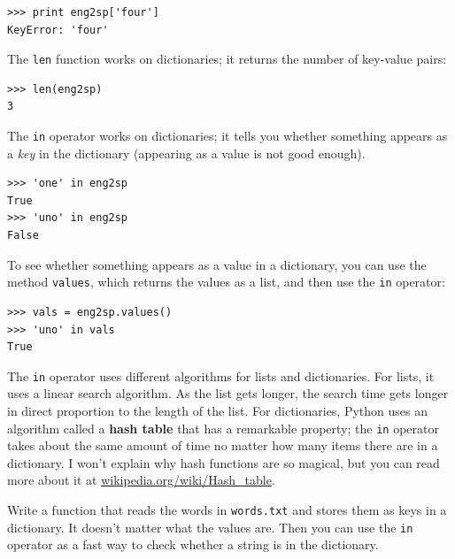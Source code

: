 \documentclass[10pt]{book}
\begin{document}

\beforeverb
\begin{verbatim}
>>> print eng2sp['four']
KeyError: 'four'
\end{verbatim}
\afterverb
%
The {\tt len} function works on dictionaries; it returns the
number of key-value pairs:


\beforeverb
\begin{verbatim}
>>> len(eng2sp)
3
\end{verbatim}
\afterverb
%
The {\tt in} operator works on dictionaries; it tells you whether
something appears as a \emph{key} in the dictionary (appearing
as a value is not good enough).


\beforeverb
\begin{verbatim}
>>> 'one' in eng2sp
True
>>> 'uno' in eng2sp
False
\end{verbatim}
\afterverb
%
To see whether something appears as a value in a dictionary, you
can use the method {\tt values}, which returns the values as
a list, and then use the {\tt in} operator:


\beforeverb
\begin{verbatim}
>>> vals = eng2sp.values()
>>> 'uno' in vals
True
\end{verbatim}
\afterverb
%
The {\tt in} operator uses different algorithms for lists and
dictionaries.  For lists, it uses a linear search algorithm.
As the list gets longer, the search time gets
longer in direct proportion to the length of the list.  
For dictionaries, Python uses an
algorithm called a {\bf hash table} that has a remarkable property; the
{\tt in} operator takes about the same amount of time no matter how
many items there are in a dictionary.  I won't explain 
why hash functions are so magical,
but you can read more about it at
\url{wikipedia.org/wiki/Hash_table}.


\begin{ex}
\label{wordlist2}


Write a function that reads the words in {\tt words.txt} and
stores them as keys in a dictionary.  It doesn't matter what the
values are.  Then you can use the {\tt in} operator
as a fast way to check whether a string is in
the dictionary.

\end{ex}
\end{document}
